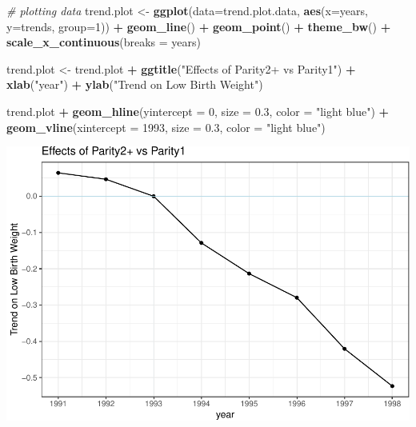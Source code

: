 \documentclass[
]{article}
\newenvironment{Shaded}{\begin{snugshade}}{\end{snugshade}}
\newcommand{\CommentTok}[1]{\textcolor[rgb]{0.56,0.35,0.01}{\textit{#1}}}
\newcommand{\DataTypeTok}[1]{\textcolor[rgb]{0.13,0.29,0.53}{#1}}
\newcommand{\DecValTok}[1]{\textcolor[rgb]{0.00,0.00,0.81}{#1}}
\newcommand{\FloatTok}[1]{\textcolor[rgb]{0.00,0.00,0.81}{#1}}
\newcommand{\KeywordTok}[1]{\textcolor[rgb]{0.13,0.29,0.53}{\textbf{#1}}}
\newcommand{\NormalTok}[1]{#1}
\newcommand{\OperatorTok}[1]{\textcolor[rgb]{0.81,0.36,0.00}{\textbf{#1}}}
\newcommand{\StringTok}[1]{\textcolor[rgb]{0.31,0.60,0.02}{#1}}
\begin{document}
\begin{Shaded}
\begin{Highlighting}[]
\CommentTok{# plotting data}
\NormalTok{trend.plot <-}\StringTok{ }\KeywordTok{ggplot}\NormalTok{(}\DataTypeTok{data=}\NormalTok{trend.plot.data, }
                     \KeywordTok{aes}\NormalTok{(}\DataTypeTok{x=}\NormalTok{years, }\DataTypeTok{y=}\NormalTok{trends, }\DataTypeTok{group=}\DecValTok{1}\NormalTok{)) }\OperatorTok{+}\StringTok{ }
\StringTok{  }\KeywordTok{geom_line}\NormalTok{() }\OperatorTok{+}
\StringTok{  }\KeywordTok{geom_point}\NormalTok{() }\OperatorTok{+}
\StringTok{  }\KeywordTok{theme_bw}\NormalTok{() }\OperatorTok{+}
\StringTok{  }\KeywordTok{scale_x_continuous}\NormalTok{(}\DataTypeTok{breaks =}\NormalTok{ years)}


\NormalTok{trend.plot <-}\StringTok{ }\NormalTok{trend.plot }\OperatorTok{+}\StringTok{ }\KeywordTok{ggtitle}\NormalTok{(}\StringTok{"Effects of Parity2+ vs Parity1"}\NormalTok{) }\OperatorTok{+}
\StringTok{  }\KeywordTok{xlab}\NormalTok{(}\StringTok{"year"}\NormalTok{) }\OperatorTok{+}
\StringTok{  }\KeywordTok{ylab}\NormalTok{(}\StringTok{"Trend on Low Birth Weight"}\NormalTok{) }

\NormalTok{trend.plot }\OperatorTok{+}\StringTok{  }
\StringTok{  }\KeywordTok{geom_hline}\NormalTok{(}\DataTypeTok{yintercept =} \DecValTok{0}\NormalTok{, }\DataTypeTok{size =} \FloatTok{0.3}\NormalTok{, }\DataTypeTok{color =} \StringTok{"light blue"}\NormalTok{) }\OperatorTok{+}
\StringTok{  }\KeywordTok{geom_vline}\NormalTok{(}\DataTypeTok{xintercept =} \DecValTok{1993}\NormalTok{, }\DataTypeTok{size =} \FloatTok{0.3}\NormalTok{, }\DataTypeTok{color =} \StringTok{"light blue"}\NormalTok{)}
\end{Highlighting}
\end{Shaded}

\includegraphics{Pset3_rough_files/figure-latex/unnamed-chunk-19-1.pdf}
\newpage   \break
\end{document}
